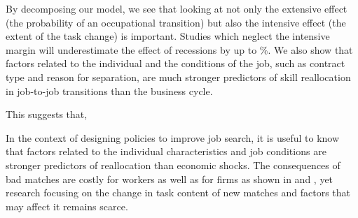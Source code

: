 \documentclass[11pt, oneside]{article}
\begin{document}
	
	\vspace{2mm}
	
  By decomposing our model, we see that looking at not only the extensive effect (the probability of an occupational transition) but also the intensive effect (the extent of the task change) is important.  Studies which neglect the intensive margin will underestimate the effect of recessions by up to \hspace{-1mm}\%. We also show that factors related to the individual and the conditions of the job, such as contract type and reason for separation, are much stronger predictors of skill reallocation in job-to-job transitions than the business cycle.
	
This suggests that, 
	
	In the context of designing policies to improve job search, it is useful to know that factors related to the individual characteristics and job conditions are stronger predictors of reallocation than economic shocks. The consequences of bad matches are costly for workers as well as for firms as shown in \cite{Fredriksson2018} and \cite{Guvenen2015}, yet research focusing on the change in task content of new matches and factors that may affect it remains scarce. 
	\vspace{2mm}

	
	
	\newpage
	
	
	
\end{document}

